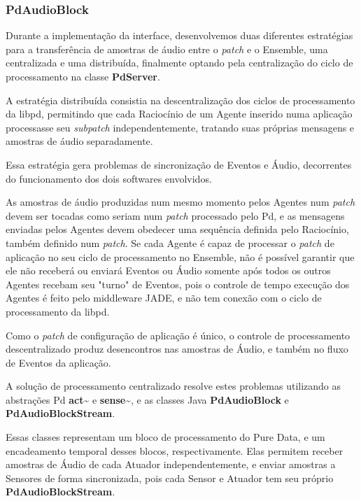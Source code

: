 \documentclass[a4paper, 11pt, twoside]{article}
\begin{document}
\begin{multicols}{2}
\subsubsection{PdAudioBlock}

Durante a implementação da interface, desenvolvemos duas diferentes estratégias
para a transferência de amostras de áudio entre o \textit{patch} e o Ensemble, 
uma centralizada e uma distribuída, finalmente optando pela centralização 
do ciclo de processamento na classe \textbf{PdServer}.

A estratégia distribuída consistia na descentralização dos ciclos de
processamento da libpd, permitindo que cada Raciocínio de um Agente
inserido numa aplicação processasse seu \textit{subpatch} independentemente,
tratando suas próprias mensagens e amostras de áudio separadamente.

Essa estratégia gera problemas de sincronização de Eventos e Áudio,
decorrentes do funcionamento dos dois softwares envolvidos.

As amostras de áudio produzidas num mesmo momento pelos Agentes 
num \textit{patch} devem ser tocadas como seriam num \textit{patch}
processado pelo Pd, e as mensagens enviadas pelos Agentes devem obedecer
uma sequência definida pelo Raciocínio, também definido num \textit{patch}.
Se cada Agente é capaz de processar o \textit{patch} de aplicação
no seu ciclo de processamento no Ensemble, não é possível garantir que ele
não receberá ou enviará Eventos ou Áudio somente após todos os outros Agentes 
recebam seu "turno" de Eventos, pois o controle de tempo execução dos Agentes 
é feito pelo middleware JADE, e não tem conexão com o ciclo de processamento
da libpd.

Como o \textit{patch} de configuração de aplicação é único, o controle de
processamento descentralizado produz desencontros nas amostras de Áudio, 
e também no fluxo de Eventos da aplicação.

A solução de processamento centralizado resolve estes problemas utilizando
as abstrações Pd \textbf{act\textasciitilde} e \textbf{sense\textasciitilde},
e as classes Java \textbf{PdAudioBlock} e \textbf{PdAudioBlockStream}.

Essas classes representam um bloco de processamento do Pure Data, e um
encadeamento temporal desses blocos, respectivamente. Elas permitem
receber amostras de Áudio de cada Atuador independentemente, e enviar
amostras a Sensores de forma sincronizada, pois cada Sensor e Atuador
tem seu próprio \textbf{PdAudioBlockStream}.


\end{multicols}
\end{document}
